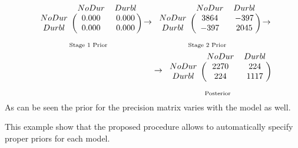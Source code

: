 \begin{eqnarray*}
\underset{\text{Stage 1 Prior}}
{\begin{blockarray}{ccc}
& NoDur & Durbl  \\ 
	\begin{block}{c(cc)}
	NoDur & 0.000 & 0.000 \\ 
	Durbl & 0.000 & 0.000 \\ 
	\end{block}
\end{blockarray} }
\rightarrow
\underset{\text{Stage 2 Prior}}
{\begin{blockarray}{ccc}
& NoDur & Durbl \\ 
	\begin{block}{c(cc)}
	NoDur & 3864 & -397 \\ 
	Durbl & -397 & 2045 \\
	\end{block}
\end{blockarray} }
\rightarrow \\
\rightarrow
\underset{\text{Posterior}}
{\begin{blockarray}{ccc}
& NoDur & Durbl \\ 
	\begin{block}{c(cc)}
	NoDur & 2270 & 224 \\ 
	Durbl & 224 & 1117 \\ 
	\end{block}
\end{blockarray}}
\end{eqnarray*}
As can be seen the prior for the precision matrix varies with the model as well. 

This example show that the proposed procedure allows to automatically specify proper priors for each model.

